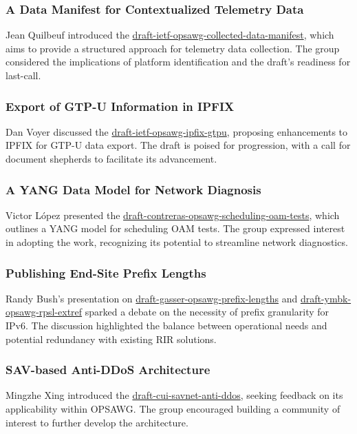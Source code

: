 \documentclass{article}
\begin{document}
\subsubsection{A Data Manifest for Contextualized Telemetry Data}
Jean Quilbeuf introduced the \href{https://datatracker.ietf.org/doc/draft-ietf-opsawg-collected-data-manifest/}{draft-ietf-opsawg-collected-data-manifest}, which aims to provide a structured approach for telemetry data collection. The group considered the implications of platform identification and the draft's readiness for last-call.

\subsubsection{Export of GTP-U Information in IPFIX}
Dan Voyer discussed the \href{https://datatracker.ietf.org/doc/draft-ietf-opsawg-ipfix-gtpu/}{draft-ietf-opsawg-ipfix-gtpu}, proposing enhancements to IPFIX for GTP-U data export. The draft is poised for progression, with a call for document shepherds to facilitate its advancement.

\subsubsection{A YANG Data Model for Network Diagnosis}
Victor López presented the \href{https://datatracker.ietf.org/doc/draft-contreras-opsawg-scheduling-oam-tests/}{draft-contreras-opsawg-scheduling-oam-tests}, which outlines a YANG model for scheduling OAM tests. The group expressed interest in adopting the work, recognizing its potential to streamline network diagnostics.

\subsubsection{Publishing End-Site Prefix Lengths}
Randy Bush's presentation on \href{https://datatracker.ietf.org/doc/html/draft-gasser-opsawg-prefix-lengths}{draft-gasser-opsawg-prefix-lengths} and \href{https://datatracker.ietf.org/doc/html/draft-ymbk-opsawg-rpsl-extref}{draft-ymbk-opsawg-rpsl-extref} sparked a debate on the necessity of prefix granularity for IPv6. The discussion highlighted the balance between operational needs and potential redundancy with existing RIR solutions.

\subsubsection{SAV-based Anti-DDoS Architecture}
Mingzhe Xing introduced the \href{https://datatracker.ietf.org/doc/draft-cui-savnet-anti-ddos/}{draft-cui-savnet-anti-ddos}, seeking feedback on its applicability within OPSAWG. The group encouraged building a community of interest to further develop the architecture.
\end{document}
